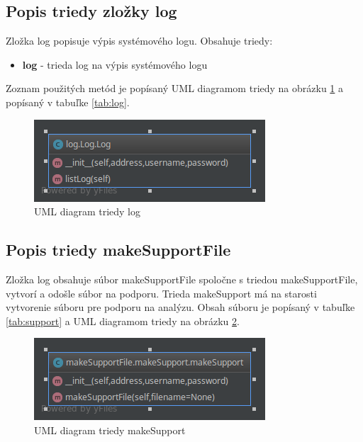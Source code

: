 \subsection{Popis triedy zložky log}
Zložka log popisuje výpis systémového logu. Obsahuje triedy:\begin{itemize}
\item \textbf{log} - trieda log na výpis systémového logu
\end{itemize}
Zoznam použitých metód je popísaný UML diagramom triedy na obrázku \ref{fig:logUML} a popísaný v tabuľke \ref{tab:log}.
\begin{table}[H]
\caption{Tabuľka metód triedy log}
\label{tab:log}
\end{table}
\begin{figure}[H]
\centering
\includegraphics[scale=0.6]{../text/logUML.png}
\caption{UML diagram triedy log}
\label{fig:logUML}
\end{figure}
\subsection{Popis triedy makeSupportFile}
Zložka log obsahuje súbor makeSupportFile spoločne s triedou makeSupportFile, vytvorí a odošle súbor na podporu. Trieda makeSupport má na starosti vytvorenie súboru pre podporu na analýzu. Obsah súboru je popísaný v tabuľke \ref{tab:support} a UML diagramom triedy na obrázku \ref{fig:support}.
\begin{table}[h!]
\caption{Tabuľka metód triedy makeSupport}
\label{tab:support}
\end{table}
\begin{figure}[H]
\centering
\includegraphics[scale=0.6]{../text/support.png}
\caption{UML diagram triedy makeSupport}
\label{fig:support}
\end{figure}
